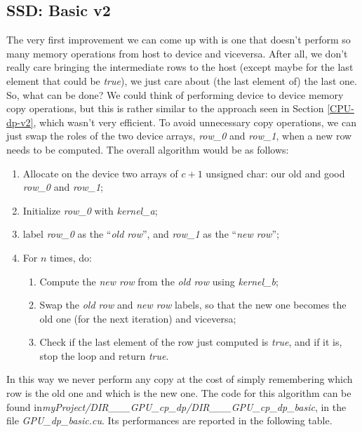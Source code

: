 \documentclass[12pt]{extarticle}
\begin{document}
\subsection{SSD: Basic v2}
The very first improvement we can come up with is one that doesn't perform so many memory operations from host to device and viceversa. After all, we don't really care bringing the intermediate rows to the host (except maybe for the last element that could be \emph{true}), we just care about (the last element of) the last one. So, what can be done?\newline
We could think of performing device to device memory copy operations, but this is rather similar to the approach seen in Section \ref{CPU-dp-v2}, which wasn't very efficient. To avoid unnecessary copy operations, we can just swap the roles of the two device arrays, \emph{row\_0} and \emph{row\_1}, when a new row needs to be computed. The overall algorithm would be as follows:
\begin{enumerate}
    \item Allocate on the device two arrays of $c+1$ unsigned char: our old and good \emph{row\_0} and \emph{row\_1};
    \item Initialize \emph{row\_0} with \emph{kernel\_a};
    \item label \emph{row\_0} as the ``\emph{old row}'', and \emph{row\_1} as the ``\emph{new row}'';
    \item For $n$ times, do:
    \begin{enumerate}
        \item Compute the \emph{new row} from the \emph{old row} using \emph{kernel\_b};
        \item Swap the \emph{old row} and \emph{new row} labels, so that the new one becomes the old one (for the next iteration) and viceversa;
        \item Check if the last element of the row just computed is \emph{true}, and if it is, stop the loop and return \emph{true}.
    \end{enumerate}
\end{enumerate}
In this way we never perform any copy at the cost of simply remembering which row is the old one and which is the new one.\newline
The code for this algorithm can be found in\newline \emph{myProject/DIR\_\_\_GPU\_cp\_dp/DIR\_\_\_GPU\_cp\_dp\_basic}, in the file \emph{GPU\_dp\_basic.cu}.\newline
Its performances are reported in the following table.
\end{document}
